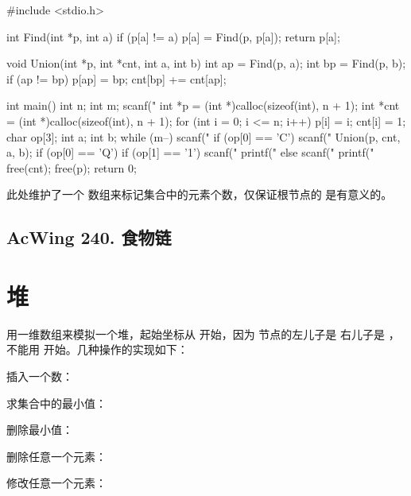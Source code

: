 \begin{mycpptwocol}[]
    #include <stdio.h>

    int Find(int *p, int a) {
        if (p[a] != a) {
            p[a] = Find(p, p[a]);
        }
        return p[a];
    }

    void Union(int *p, int *cnt, int a, int b) {
        int ap = Find(p, a);
        int bp = Find(p, b);
        if (ap != bp) {
            p[ap] = bp;
            cnt[bp] += cnt[ap];
        }
    }

    int main() {
        int n;
        int m;
        scanf("%
        int *p = (int *)calloc(sizeof(int), n + 1);
        int *cnt = (int *)calloc(sizeof(int), n + 1);
        for (int i = 0; i <= n; i++) {
            p[i] = i;
            cnt[i] = 1;
        }
        char op[3];
        int a;
        int b;
        while (m--) {
            scanf("%
            if (op[0] == 'C') {
                scanf("%
                Union(p, cnt, a, b);
            }
            if (op[0] == 'Q') {
                if (op[1] == '1') {
                    scanf("%
                    printf("%
                } else {
                    scanf("%
                    printf("%
                }
            }
        }
        free(cnt);
        free(p);
        return 0;
    }
\end{mycpptwocol}

\begin{information}
    此处维护了一个  数组来标记集合中的元素个数，仅保证根节点的  是有意义的。
\end{information}

\subsection{AcWing 240. 食物链}


\section{堆}

用一维数组来模拟一个堆，起始坐标从  开始，因为  节点的左儿子是  右儿子是  ，不能用  开始。几种操作的实现如下：

\begin{myenum}
    \item 插入一个数： 
    \item 求集合中的最小值： 
    \item 删除最小值： 
    \item 删除任意一个元素： 
    \item 修改任意一个元素： 
\end{myenum}

